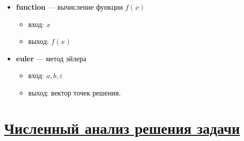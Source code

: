\documentclass[14pt]{extarticle}
\begin{document}
	\begin{itemize}
		\item \textbf{function} — вычисление функции $f(x)$
		\begin{itemize}
			\item вход: $x$
			\item выход: $f(x)$
		\end{itemize}
		
		\item \textbf{euler} — метод эйлера
		\begin{itemize}
			\item вход: $a, b, \varepsilon$
			\item выход: вектор точек решения.
		\end{itemize}
	\end{itemize}
	
	
	\newpage
	\section{\Large \underline{Численный анализ решения задачи}}
	
\end{document}
